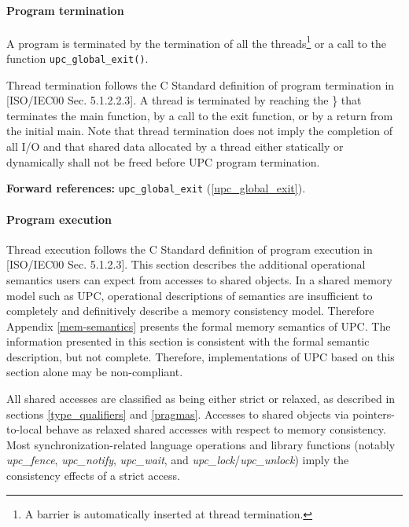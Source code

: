 \paragraph{Program termination}

\npf A program is terminated by the termination of all the
      threads\footnote{A barrier is automatically inserted at thread termination.} or a call
      to the function {\tt upc\_global\_exit()}.

\np Thread termination follows the C Standard definition of
    program termination in [ISO/IEC00 Sec. 5.1.2.2.3]. A thread is
    terminated by reaching the \}  that terminates the main
    function, by a call to the exit function, or by a return from the
    initial main. Note that thread termination does not imply the
    completion of all I/O and that shared data allocated by a thread
    either statically or dynamically shall not be freed before UPC
    program termination.

     {\bf Forward references:} {\tt upc\_global\_exit} (\ref{upc_global_exit}).  

\paragraph{Program execution}
\label{strict_relaxed}

\npf Thread execution follows the C Standard definition of
  program execution in [ISO/IEC00 Sec. 5.1.2.3].  This section describes
  the additional operational semantics users can expect from accesses to shared
  objects.  In a shared memory model such as UPC, operational
  descriptions of semantics are insufficient to completely
  and definitively describe a memory consistency model.  Therefore
  Appendix \ref{mem-semantics} presents the formal memory
  semantics of UPC.  The information presented in this section is consistent with
  the formal semantic description, but not complete.  Therefore, implementations
  of UPC based on this section alone may be non-compliant.
  
\np All shared accesses are classified as being either strict or relaxed,
  as described in sections \ref{type_qualifiers} and \ref{pragmas}.
  Accesses to shared objects via
  pointers-to-local behave as relaxed shared accesses with respect to memory
  consistency. Most synchronization-related language operations and library
  functions (notably {\it upc\_fence}, {\it upc\_notify}, {\it upc\_wait}, and
  {\it upc\_lock}/{\it upc\_unlock}) imply the consistency effects of a strict
  access.

